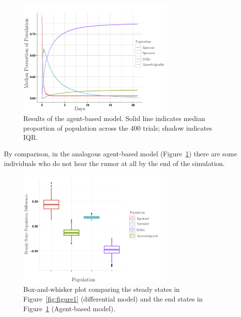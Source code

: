 \begin{figure}[H]
\captionsetup{width=0.8\textwidth}
\centering
    \includegraphics[width=0.7\textwidth]{figures/figure5}
  \caption{Results of the agent-based model.
Solid line indicates median proportion of population across the 400 trials; shadow indicates IQR.}
\label{fig:figure5}
\end{figure}

By comparison, in the analogous agent-based model (Figure~\ref{fig:figure5}) there are some individuals who do not hear the rumor at all by the end of the simulation.

\begin{figure}[H]
\captionsetup{width=0.8\textwidth}
\centering
    \includegraphics[width=0.7\textwidth]{figures/figure6}
  \caption{Box-and-whisker plot comparing the steady states in Figure~\ref{fig:figure1} (differential model) and the end states in Figure~\ref{fig:figure5} (Agent-based model).}
\label{fig:figure6}
\end{figure}

